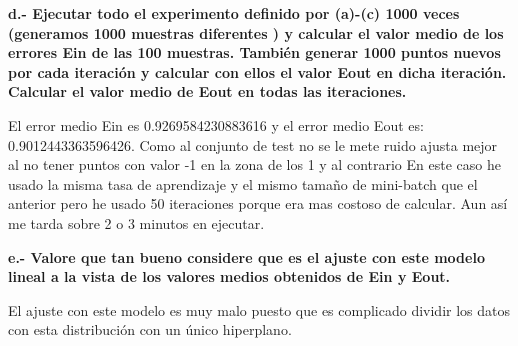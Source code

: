 \documentclass[titlepage]{article}
\begin{document}
 	\textbf{d.- Ejecutar todo el experimento definido por (a)-(c) 1000 veces (generamos 1000 muestras diferentes ) y calcular el valor medio de los errores  Ein de las 100 muestras. También generar 1000 puntos nuevos por cada iteración y calcular con ellos el valor Eout en dicha iteración. Calcular el valor medio de Eout en todas las iteraciones.}
 	\newline
 
 	El error medio Ein es 0.9269584230883616 y el error medio Eout es: 0.9012443363596426. Como al conjunto de test no se le mete ruido ajusta mejor al no tener puntos con valor -1 en la zona de los 1 y al contrario
 	En este caso he usado la misma tasa de aprendizaje y el mismo tamaño de mini-batch que el anterior pero he usado 50 iteraciones porque era mas costoso de calcular. Aun así me tarda sobre 2 o 3 minutos en ejecutar. 
 	\newline
 	
 	
 		
 	
 \newpage
 
 \newpage
	 \textbf{e.- Valore que tan bueno considere que es el ajuste con este modelo lineal a la vista de los valores medios obtenidos de Ein y Eout.}
	 \newline
	 
	 El ajuste con este modelo es muy malo puesto que es complicado dividir los datos con esta distribución con un único hiperplano. 
 \newpage
  
\end{document}
